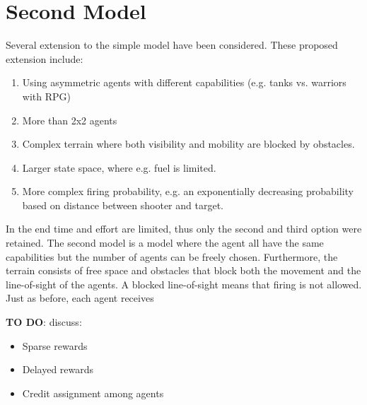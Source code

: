 \section{Second Model}
Several extension to the simple model have been considered. These proposed extension include:
\begin{enumerate}
    \item Using asymmetric agents with different capabilities (e.g. tanks vs. warriors with RPG)
    \item More than 2x2 agents
    \item Complex terrain where both visibility and mobility are blocked by obstacles.
    \item Larger state space, where e.g. fuel is limited.
    \item More complex firing probability, e.g. an exponentially decreasing probability based on distance between shooter and target.
\end{enumerate}
In the end time and effort are limited, thus only the second and third option were retained. The second model is a model where the agent all have the same capabilities but the number of agents can be freely chosen. Furthermore, the terrain consists of free space and obstacles that block both the movement and the line-of-sight of the agents. A blocked line-of-sight means that firing is not allowed.\\
Just as before, each agent receives

\textbf{TO DO}: discuss:
\begin{itemize}
    \item Sparse rewards
    \item Delayed rewards
    \item Credit assignment among agents
\end{itemize}